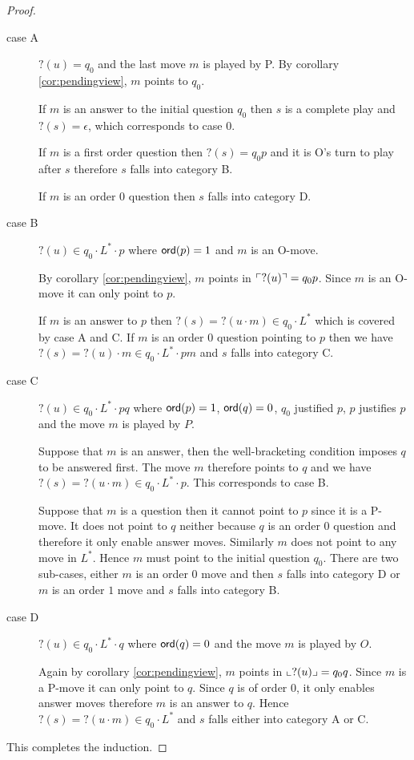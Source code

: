\begin{proof}
\begin{description}
\item[case A] $?(u) = q_0$ and the last move $m$ is played by P.
    By corollary \ref{cor:pendingview}, $m$ points to $q_0$.

    If $m$ is an answer to the initial question $q_0$ then
    $s$ is a complete play and $?(s) = \epsilon$, which corresponds to case 0.

    If $m$ is a first order question then $?(s)= q_0 p$ and it is O's turn to play after $s$ therefore $s$ falls into category B.

    If $m$ is an order 0 question then $s$ falls into category D.

\item[case B] $?(u) \in q_0 \cdot L^* \cdot p$ where ${\sf ord}(p) = 1$ and $m$ is an O-move.

By corollary \ref{cor:pendingview}, $m$ points in $\ulcorner ?(u) \urcorner = q_0 p$. Since $m$ is an O-move it can only point to $p$.

If $m$ is an answer to $p$ then $?(s) = ?(u \cdot m) \in q_0 \cdot L^*$ which is covered by case A and C.
If $m$ is an order 0 question pointing to $p$ then we have $?(s) = ?(u) \cdot m \in q_0 \cdot L^* \cdot p m$ and $s$ falls into category C.


\item[case C] $?(u) \in q_0 \cdot L^* \cdot p q$ where ${\sf ord}(p) = 1$, ${\sf ord}(q) = 0$, $q_0$ justified $p$, $p$ justifies $p$
                 and the move $m$ is played by $P$.

Suppose that $m$ is an answer, then the well-bracketing condition imposes
$q$ to be answered first. The move $m$ therefore points to $q$ and we have $?(s) = ?(u \cdot m) \in  q_0 \cdot L^* \cdot p$. This corresponds to case B.

Suppose that $m$ is a question then it cannot point to $p$ since it is a P-move. It does not point to $q$ neither because $q$ is an order $0$
question and therefore it only enable answer moves. Similarly $m$ does not point to any move in $L^*$.
Hence $m$ must point to the initial question $q_0$.
There are two sub-cases, either $m$ is an order $0$ move and then $s$ falls into category D
or $m$ is an order $1$ move and $s$ falls into category B.


\item[case D] $?(u) \in q_0 \cdot L^* \cdot q$ where ${\sf ord}(q) = 0$ and the move $m$ is played by $O$.

Again by corollary \ref{cor:pendingview}, $m$ points in $\llcorner ?(u) \lrcorner = q_0 q$. Since $m$ is a P-move it can only point to $q$.
Since $q$ is of order 0, it only enables answer moves therefore $m$ is an answer to $q$.
Hence $?(s) = ?(u\cdot m) \in q_0 \cdot L^* $ and $s$ falls either into category A or C.

\end{description}

This completes the induction.
\end{proof}


